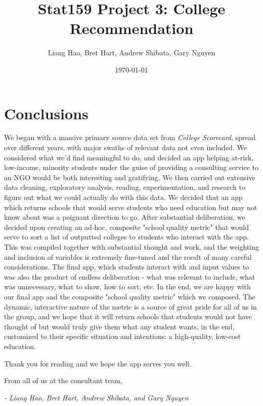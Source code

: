 \documentclass{article}\usepackage[]{graphicx}\usepackage[]{color}
\title{Stat159 Project 3: College Recommendation}
\author{Liang Hao, Bret Hart, Andrew Shibata, Gary Nguyen}
\date{\today}
\begin{document}
\maketitle
\section{Conclusions}

We began with a massive primary source data set from \emph{College Scorecard}, spread over different years, with major swaths of relevant data not even included. We considered what we'd find meaningful to do, and decided an app helping at-risk, low-income, minority students under the guise of providing a consulting service to an NGO would be both interesting and gratifying. We then carried out extensive data cleaning, exploratory analysis, reading, experimentation, and research to figure out what we could actually do with this data. We decided that an app which returns schools that would serve students who need education but  may not know about was a poignant direction to go. After substantial deliberation, we decided upon creating an ad-hoc, composite "school quality metric" that would serve to sort a list of outputted colleges to students who interact with the app. This was compiled together with substantial thought and work, and the weighting and inclusion of variables is extremely fine-tuned and the result of many careful considerations. The final app, which students interact with and input values to was also the product of endless deliberation - what was relevant to include, what was unnecessary, what to show, how to sort, etc. In the end, we are happy with our final app and the composite "school quality metric" which we composed. The dynamic, interactive nature of the metric is a source of great pride for all of us in the group, and we hope that it will return schools that students would not have thought of but would truly give them what any student wants, in the end, customized to their specific situation and intentions: a high-quality, low-cost education.\newline

Thank you for reading and we hope the app serves you well.\newline

From all of us at the consultant team,

\textit{- Liang Hao, Bret Hart, Andrew Shibata, and Gary Nguyen}
\end{document}
